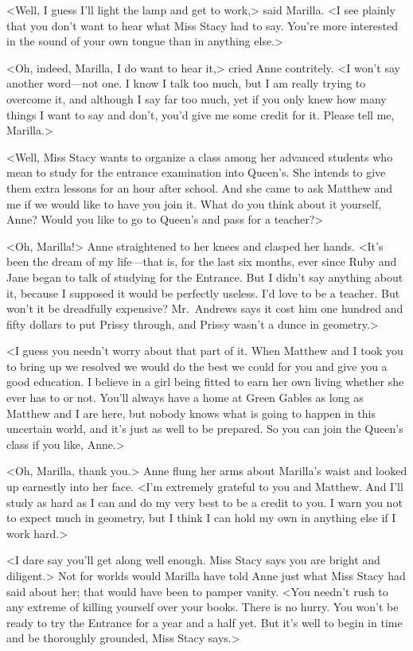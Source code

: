 <Well, I guess I'll light the lamp and get to work,> said Marilla. <I see plainly that you don't want to hear what Miss Stacy had to say. You're more interested in the sound of your own tongue than in anything else.>

<Oh, indeed, Marilla, I do want to hear it,> cried Anne contritely. <I won't say another word—not one. I know I talk too much, but I am really trying to overcome it, and although I say far too much, yet if you only knew how many things I want to say and don't, you'd give me some credit for it. Please tell me, Marilla.>

<Well, Miss Stacy wants to organize a class among her advanced students who mean to study for the entrance examination into Queen's. She intends to give them extra lessons for an hour after school. And she came to ask Matthew and me if we would like to have you join it. What do you think about it yourself, Anne? Would you like to go to Queen's and pass for a teacher?>

<Oh, Marilla!> Anne straightened to her knees and clasped her hands. <It's been the dream of my life—that is, for the last six months, ever since Ruby and Jane began to talk of studying for the Entrance. But I didn't say anything about it, because I supposed it would be perfectly useless. I'd love to be a teacher. But won't it be dreadfully expensive? Mr.~Andrews says it cost him one hundred and fifty dollars to put Prissy through, and Prissy wasn't a dunce in geometry.>

<I guess you needn't worry about that part of it. When Matthew and I took you to bring up we resolved we would do the best we could for you and give you a good education. I believe in a girl being fitted to earn her own living whether she ever has to or not. You'll always have a home at Green Gables as long as Matthew and I are here, but nobody knows what is going to happen in this uncertain world, and it's just as well to be prepared. So you can join the Queen's class if you like, Anne.>

<Oh, Marilla, thank you.> Anne flung her arms about Marilla's waist and looked up earnestly into her face. <I'm extremely grateful to you and Matthew. And I'll study as hard as I can and do my very best to be a credit to you. I warn you not to expect much in geometry, but I think I can hold my own in anything else if I work hard.>

<I dare say you'll get along well enough. Miss Stacy says you are bright and diligent.> Not for worlds would Marilla have told Anne just what Miss Stacy had said about her; that would have been to pamper vanity. <You needn't rush to any extreme of killing yourself over your books. There is no hurry. You won't be ready to try the Entrance for a year and a half yet. But it's well to begin in time and be thoroughly grounded, Miss Stacy says.>


